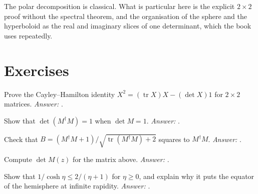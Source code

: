 \begin{standsbox}
The polar decomposition is classical. What is particular here is the explicit $2\times2$ proof without the spectral theorem, and the organisation of the sphere and the hyperboloid as the real and imaginary slices of one determinant, which the book uses repeatedly.
\end{standsbox}

\section*{Exercises}

\begin{exercise}
Prove the Cayley--Hamilton identity $X^2=(\operatorname{tr}X)X-(\det X)1$ for $2\times2$ matrices. \emph{Answer:} .
\end{exercise}

\begin{exercise}
Show that $\det(M^\dagger M)=1$ when $\det M=1$. \emph{Answer:} .
\end{exercise}

\begin{exercise}
Check that $B=(M^\dagger M+1)/\sqrt{\operatorname{tr}(M^\dagger M)+2}$ squares to $M^\dagger M$. \emph{Answer:} .
\end{exercise}

\begin{exercise}
Compute $\det M(z)$ for the matrix above. \emph{Answer:} .
\end{exercise}

\begin{exercise}
Show that $1/\cosh\eta\le2/(\eta+1)$ for $\eta\ge0$, and explain why it puts the equator of the hemisphere at infinite rapidity. \emph{Answer:} .
\end{exercise}
